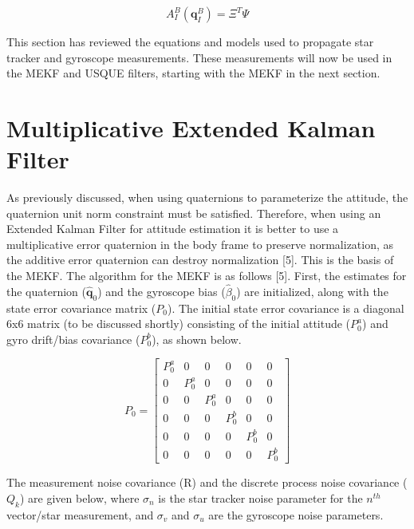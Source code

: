 \documentclass[12pt]{report}
\begin{document}
\begin{equation}
	A_I^B(\pmb{q}_I^B) = \Xi^T\Psi
\end{equation}

\noindent This section has reviewed the equations and models used to propagate star tracker and gyroscope measurements. These measurements will now be used in the MEKF and USQUE filters, starting with the MEKF in the next section.

\section*{Multiplicative Extended Kalman Filter}

\noindent As previously discussed, when using quaternions to parameterize the attitude, the quaternion unit norm constraint must be satisfied. Therefore, when using an Extended Kalman Filter for attitude estimation it is better to use a multiplicative error quaternion in the body frame to preserve normalization, as the additive error quaternion can destroy normalization [5]. This is the basis of the MEKF. The algorithm for the MEKF is as follows [5]. First, the estimates for the quaternion ($\pmb{\hat{q}}_0$) and the gyroscope bias ($\hat{\beta}_0$) are initialized, along with the state error covariance matrix ($P_0$). The initial state error covariance is a diagonal 6x6 matrix (to be discussed shortly) consisting of the initial attitude ($P_0^a$) and gyro drift/bias covariance ($P_0^b$), as shown below.

\begin{equation}
	P_0 = \begin{bmatrix}
		P_0^a & 0 & 0 & 0 & 0 & 0 \\
		0 & P_0^a & 0 & 0 & 0 & 0 \\
		0 & 0 & P_0^a & 0 & 0 & 0\\
		0 & 0 & 0 & P_0^b & 0 & 0 \\
		0 & 0 & 0 & 0 & P_0^b & 0 \\
		0 & 0 & 0 & 0 & 0 & P_0^b	
	\end{bmatrix}
\end{equation}

\noindent The measurement noise covariance (R) and the discrete process noise covariance ($Q_k$) are given below, where $\sigma_{n}$ is the star tracker noise parameter for the $n^{th}$ vector/star measurement,  and $\sigma_v$  and $\sigma_u$ are the gyroscope noise parameters. 
\end{document}
